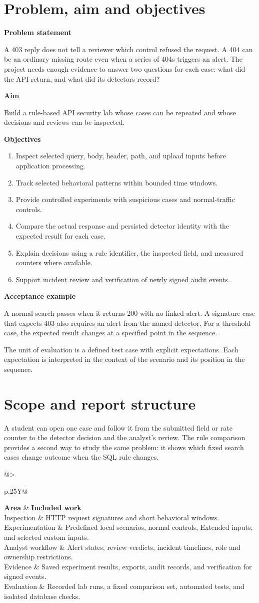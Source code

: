 \documentclass[11pt,a4paper,oneside]{report}
\makeatletter
\newcommand{\topic}[1]{\par\addvspace{4pt}\noindent\textbf{#1}\par\nobreak\vspace{-.20em}}
\newcommand{\sheet}[1]{\clearpage\section{#1}}
\newcommand{\tabletitle}[1]{\par\addvspace{6pt}\noindent\parbox{\linewidth}{\captionof{table}{#1}}\par\nobreak}
\newcommand{\bodytable}[1]{\begin{tabularx}{\linewidth}{@{}>{\raggedright\arraybackslash}p{.25\linewidth}Y@{}}\toprule #1\bottomrule\end{tabularx}}
\newcommand{\callout}[1]{\noindent\colorbox{papergray}{\parbox{\dimexpr\linewidth-2\fboxsep\relax}{\small\strut #1\strut}}}
\makeatother
\begin{document}
\sheet{Problem, aim and objectives}
\topic{Problem statement}
A 403 reply does not tell a reviewer which control refused the request. A 404 can be an ordinary missing route even when a series of 404s triggers an alert. The project needs enough evidence to answer two questions for each case: what did the API return, and what did its detectors record?

\topic{Aim}
Build a rule-based API security lab whose cases can be repeated and whose decisions and reviews can be inspected.

\topic{Objectives}
\begin{enumerate}
\item Inspect selected query, body, header, path, and upload inputs before application processing.
\item Track selected behavioral patterns within bounded time windows.
\item Provide controlled experiments with suspicious cases and normal-traffic controls.
\item Compare the actual response and persisted detector identity with the expected result for each case.
\item Explain decisions using a rule identifier, the inspected field, and measured counters where available.
\item Support incident review and verification of newly signed audit events.
\end{enumerate}

\topic{Acceptance example}
A normal search passes when it returns 200 with no linked alert. A signature case that expects 403 also requires an alert from the named detector. For a threshold case, the expected result changes at a specified point in the sequence.

\callout{The unit of evaluation is a defined test case with explicit expectations. Each expectation is interpreted in the context of the scenario and its position in the sequence.}

\sheet{Scope and report structure}
A student can open one case and follow it from the submitted field or rate counter to the detector decision and the analyst's review. The rule comparison provides a second way to study the same problem: it shows which fixed search cases change outcome when the SQL rule changes.

\tabletitle{Scope of the project}
\bodytable{\textbf{Area} & \textbf{Included work}\\\midrule
Inspection & HTTP request signatures and short behavioral windows.\\
Experimentation & Predefined local scenarios, normal controls, Extended inputs, and selected custom inputs.\\
Analyst workflow & Alert states, review verdicts, incident timelines, role and ownership restrictions.\\
Evidence & Saved experiment results, exports, audit records, and verification for signed events.\\
Evaluation & Recorded lab runs, a fixed comparison set, automated tests, and isolated database checks.\\}
\par
\end{document}

